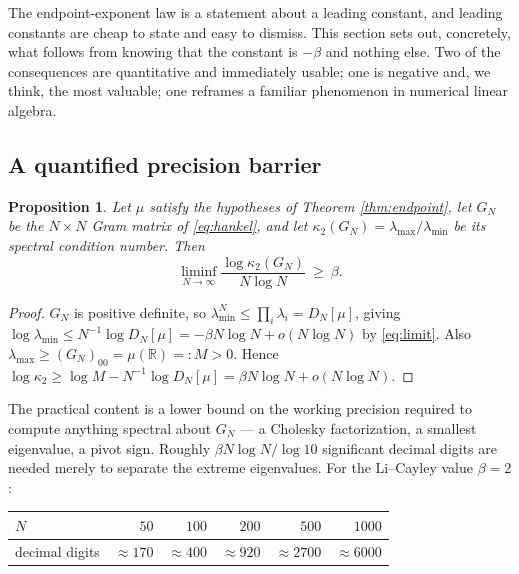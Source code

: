 \documentclass[11pt]{amsart}
\numberwithin{equation}{section}
\theoremstyle{plain}
\newtheorem{proposition}[theorem]{Proposition}
\theoremstyle{definition}
\theoremstyle{remark}
\begin{document}
The endpoint-exponent law is a statement about a leading constant, and leading constants are cheap
to state and easy to dismiss. This section sets out, concretely, what follows from knowing that the
constant is $-\beta$ and nothing else. Two of the consequences are quantitative and immediately
usable; one is negative and, we think, the most valuable; one reframes a familiar phenomenon in
numerical linear algebra.

\subsection{A quantified precision barrier}
\label{ss:conditioning}

\begin{proposition}
\label{prop:kappa}
Let $\mu$ satisfy the hypotheses of Theorem \ref{thm:endpoint}, let $G_{N}$ be the $N\times N$ Gram
matrix of \eqref{eq:hankel}, and let $\kappa_{2}(G_{N})=\lambda_{\max}/\lambda_{\min}$ be its
spectral condition number. Then
\begin{equation}
\liminf_{N\to\infty}\frac{\log\kappa_{2}(G_{N})}{N\log N}\ \ge\ \beta .
\label{eq:kappa}
\end{equation}
\end{proposition}

\begin{proof}
$G_{N}$ is positive definite, so $\lambda_{\min}^{N}\le\prod_{i}\lambda_{i}=D_{N}[\mu]$, giving
$\log\lambda_{\min}\le N^{-1}\log D_{N}[\mu]=-\beta N\log N+o(N\log N)$ by \eqref{eq:limit}.
Also $\lambda_{\max}\ge(G_{N})_{00}=\mu(\mathbb R)=:M>0$. Hence
$\log\kappa_{2}\ge\log M-N^{-1}\log D_{N}[\mu]=\beta N\log N+o(N\log N)$.
\end{proof}

The practical content is a lower bound on the working precision required to compute anything
spectral about $G_{N}$ --- a Cholesky factorization, a smallest eigenvalue, a pivot sign. Roughly
$\beta N\log N/\log10$ significant decimal digits are needed merely to separate the extreme
eigenvalues. For the Li--Cayley value $\beta=2$:

\begin{center}
\begin{tabular}{lrrrrr}
\toprule
$N$ & $50$ & $100$ & $200$ & $500$ & $1000$\\
\midrule
decimal digits & $\approx170$ & $\approx400$ & $\approx920$ & $\approx2700$ & $\approx6000$\\
\bottomrule
\end{tabular}
\end{center}
\end{document}
